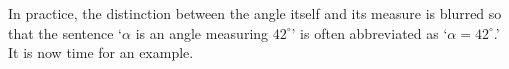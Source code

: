 \documentclass[12pt]{ximera}
\begin{document}
\[ \begin{array}{cc}

 

&

\hspace{1in}

 

\\  \end{array} \]

In practice, the distinction between the angle itself and its measure is blurred so that the sentence `$\alpha$ is an angle measuring $42^{\circ}$' is often abbreviated as `$\alpha = 42^{\circ}$.'  It is now time for an example.
\end{document}
